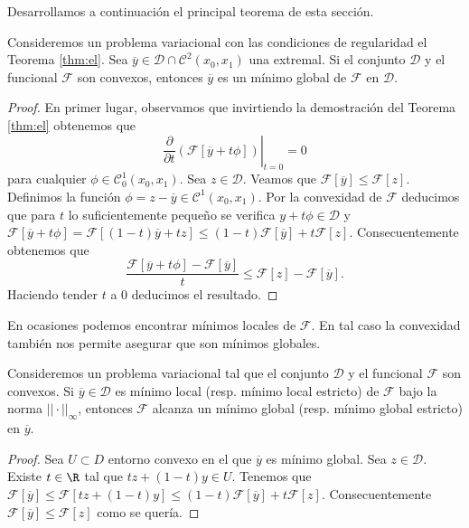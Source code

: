 \documentclass{article}
\begin{document}
Desarrollamos a continuación el principal teorema de esta sección.

\begin{theorem}
  \label{thm:convex:minimo}
  Consideremos un problema variacional con las condiciones de regularidad el Teorema
  \ref{thm:el}. Sea $\overline{y} \in \mathcal{D} \cap \mathcal{C}^2(x_0,x_1)$ una extremal. Si el
  conjunto $\mathcal{D}$ y el funcional $\mathcal{F}$ son convexos, entonces $\overline{y}$ es un
  mínimo global de $\mathcal{F}$ en $\mathcal{D}$.
\end{theorem}
\begin{proof}
  En primer lugar, observamos que invirtiendo la demostración del Teorema \ref{thm:el} obtenemos que
  \[ \left.\frac{\partial}{\partial t}\left( \mathcal{F}[ \overline{y} + t \phi ] \right)\right|_{t
      = 0} = 0 \] para cualquier $\phi \in \mathcal{C}_0^1(x_0,x_1)$. Sea $z \in
  \mathcal{D}$. Veamos que $\mathcal{F}[ \overline{y} ] \le \mathcal{F}[z]$. Definimos la función
  $\phi = z - \overline{y} \in \mathcal{C}^1(x_0,x_1)$. Por la convexidad de $\mathcal{F}$ deducimos
  que para $t$ lo suficientemente pequeño se verifica $y+t\phi \in \mathcal{D}$ y
  $\mathcal{F}[\overline{y}+t\phi] = \mathcal{F}[(1-t)\overline{y}+ tz] \le
  (1-t)\mathcal{F}[\overline{y}] + t \mathcal{F}[z]$. Consecuentemente obtenemos que
  \[ \frac{\mathcal{F}[\overline{y}+t\phi] - \mathcal{F}[\overline{y}]}{t} \le \mathcal{F}[z] -
    \mathcal{F}[\overline{y}]. \] Haciendo tender $t$ a $0$ deducimos el resultado.
\end{proof}

En ocasiones podemos encontrar mínimos locales de $\mathcal{F}$. En tal caso la convexidad también
nos permite asegurar que son mínimos globales.

\begin{prop}
  Consideremos un problema variacional tal que el conjunto $\mathcal{D}$ y el funcional
  $\mathcal{F}$ son convexos. Si $\overline{y} \in \mathcal{D}$ es mínimo local (resp. mínimo local
  estricto) de $\mathcal{F}$ bajo la norma $||\cdot||_{\infty}$, entonces $\mathcal{F}$ alcanza un
  mínimo global (resp. mínimo global estricto) en $\overline{y}$.
\end{prop}
\begin{proof}
  Sea $U \subset D$ entorno convexo en el que $\overline{y}$ es mínimo global. Sea
  $z \in \mathcal{D}$. Existe $t \in \R$ tal que $tz+(1-t)y \in U$. Tenemos que
  $\mathcal{F}[ \overline{y} ] \le \mathcal{F}[tz+(1-t)y] \le (1-t)\mathcal{F}[\overline{y}] + t
  \mathcal{F}[z]$. Consecuentemente $\mathcal{F}[ \overline{y} ] \le \mathcal{F}[z]$ como se quería.
\end{proof}
\end{document}
